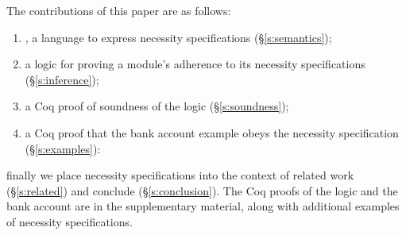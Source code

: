 The contributions of this paper are as follows:
 
 \begin{enumerate}
 \item
\Chainmail, a language to
express necessity specifications (\S\ref{s:semantics});
 \item
a logic for proving a module's adherence to its
necessity specifications (\S\ref{s:inference});
\item
  a Coq proof of soundness of the logic (\S\ref{s:soundness});
\item
  a Coq proof that the bank account example obeys the necessity
  specification (\S\ref{s:examples}):
\end{enumerate}


\noindent finally we place necessity specifications into the context
of related work (\S\ref{s:related}) and conclude (\S\ref{s:conclusion}).
The Coq proofs of the logic and the bank account are in the
supplementary material, along with additional examples of necessity specifications.










